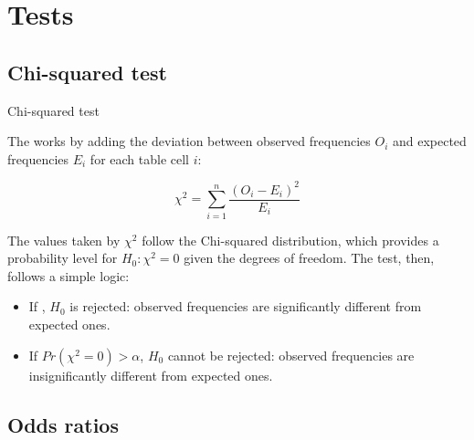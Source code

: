 \documentclass{beamer}
\begin{document}
	\section{Tests}
	
	\subsection{Chi-squared test}

	\begin{frame}[t]{Chi-squared test}
	
	The  works by adding the deviation between observed frequencies $O_i$ and expected frequencies $E_i$ for each table cell $i$:
	
	$$\chi^2=\sum_{i=1}^{n} \frac{(O_i - E_i)^2}{E_i}$$	
	
	The values taken by $\chi^2$ follow the Chi-squared distribution, which provides a probability level for $H_0: \chi^2=0$ given the degrees of freedom. The test, then, follows a simple logic:
	
	\begin{itemize}
		\item If , $H_0$ is rejected: observed frequencies are significantly different from expected ones.
		\item If $Pr(\chi^2=0) > \alpha$, $H_0$ cannot be rejected: observed frequencies are insignificantly different from expected ones.
	\end{itemize}
	
	\end{frame}
	

	\subsection{Odds ratios}
\end{document}
